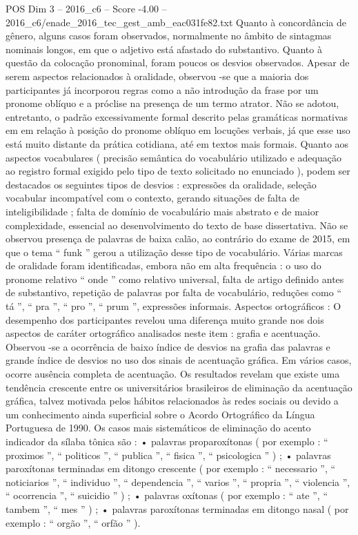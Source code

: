 \begin{textsample}{POS Dim 3 – 2016\_c6 – Score -4.00 – 2016\_c6/enade\_2016\_tec\_gest\_amb\_eac031fe82.txt}
Quanto à concordância de gênero, alguns casos foram observados, normalmente no âmbito de sintagmas nominais longos, em que o adjetivo está afastado do substantivo.
Quanto à questão da colocação pronominal, foram poucos os desvios observados.
Apesar de serem aspectos relacionados à oralidade, observou -se que a maioria dos participantes já incorporou regras como a não introdução da frase por um pronome oblíquo e a próclise na presença de um termo atrator.
Não se adotou, entretanto, o padrão excessivamente formal descrito pelas gramáticas normativas em em relação à posição do pronome oblíquo em locuções verbais, já que esse uso está muito distante da prática cotidiana, até em textos mais formais.
Quanto aos aspectos vocabulares ( precisão semântica do vocabulário utilizado e adequação ao registro formal exigido pelo tipo de texto solicitado no enunciado ), podem ser destacados os seguintes tipos de desvios : expressões da oralidade, seleção vocabular incompatível com o contexto, gerando situações de falta de inteligibilidade ; falta de domínio de vocabulário mais abstrato e de maior complexidade, essencial ao desenvolvimento do texto de base dissertativa.
Não se observou presença de palavras de baixa calão, ao contrário do exame de 2015, em que o tema “ funk ” gerou a utilização desse tipo de vocabulário.
Várias marcas de oralidade foram identificadas, embora não em alta frequência : o uso do pronome relativo “ onde ” como relativo universal, falta de artigo definido antes de substantivo, repetição de palavras por falta de vocabulário, reduções como “ tá ”, “ pra ”, “ pro ”, “ prum ”, expressões informais.
Aspectos ortográficos : O desempenho dos participantes revelou uma diferença muito grande nos dois aspectos de caráter ortográfico analisados neste item : grafia e acentuação.
Observou -se a ocorrência de baixo índice de desvios na grafia das palavras e grande índice de desvios no uso dos sinais de acentuação gráfica.
Em vários casos, ocorre ausência completa de acentuação.
Os resultados revelam que existe uma tendência crescente entre os universitários brasileiros de eliminação da acentuação gráfica, talvez motivada pelos hábitos relacionados às redes sociais ou devido a um conhecimento ainda superficial sobre o Acordo Ortográfico da Língua Portuguesa de 1990.
Os casos mais sistemáticos de eliminação do acento indicador da sílaba tônica são : • palavras proparoxítonas ( por exemplo : “ proximos ”, “ politicos ”, “ publica ”, “ fisica ”, “ psicologica ” ) ; • palavras paroxítonas terminadas em ditongo crescente ( por exemplo : “ necessario ”, “ noticiarios ”, “ individuo ”, “ dependencia ”, “ varios ”, “ propria ”, “ violencia ”, “ ocorrencia ”, “ suicidio ” ) ; • palavras oxítonas ( por exemplo : “ ate ”, “ tambem ”, “ mes ” ) ; • palavras paroxítonas terminadas em ditongo nasal ( por exemplo : “ orgão ”, “ orfão ” ).

\end{textsample}
